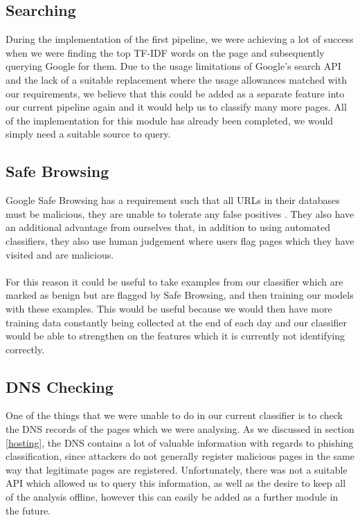 \documentclass[12pt,twoside]{report}
\begin{document}
\subsection{Searching}
During the implementation of the first pipeline, we were achieving a lot of success when we were finding the top TF-IDF words on the page and subsequently querying Google for them. Due to the usage limitations of Google's search API and the lack of a suitable replacement where the usage allowances matched with our requirements, we believe that this could be added as a separate feature into our current pipeline again and it would help us to classify many more pages. All of the implementation for this module has already been completed, we would simply need a suitable source to query.
\clearpage
\subsection{Safe Browsing}
Google Safe Browsing has a requirement such that all URLs in their databases must be malicious, they are unable to tolerate any false positives \cite{safebrowsing}. They also have an additional advantage from ourselves that, in addition to using automated classifiers, they also use human judgement where users flag pages which they have visited and are malicious.
\\\\
For this reason it could be useful to take examples from our classifier which are marked as benign but are flagged by Safe Browsing, and then training our models with these examples. This would be useful because we would then have more training data constantly being collected at the end of each day and our classifier would be able to strengthen on the features which it is currently not identifying correctly.
\subsection{DNS Checking}
One of the things that we were unable to do in our current classifier is to check the DNS records of the pages which we were analysing. As we discussed in section \ref{hosting}, the DNS contains a lot of valuable information with regards to phishing classification, since attackers do not generally register malicious pages in the same way that legitimate pages are registered. Unfortunately, there was not a suitable API which allowed us to query this information, as well as the desire to keep all of the analysis offline, however this can easily be added as a further module in the future.
\end{document}
